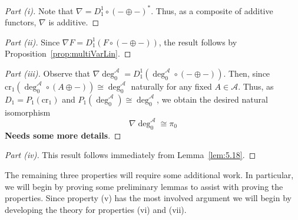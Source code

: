 \begin{proof}[Part (i)]
    Note that $\nabla = D_1^1\circ (-\oplus-)^*$. Thus, as a composite of additive functors, $\nabla$ is additive.
\end{proof}


\begin{proof}[Part (ii)]
    Since $\nabla F = D_1^1(F\circ (-\oplus -))$, the result follows by Proposition~\ref{prop:multiVarLin}. 
\end{proof}


\begin{proof}[Part (iii)]
    Observe that $\nabla\deg_0^\mathcal{A} = D_1^1(\deg_0^\mathcal{A}\circ (-\oplus -))$. Then, since $\text{cr}_1(\deg_0^\mathcal{A}\circ (A\oplus -)) \cong \deg_0^\mathcal{A}$ naturally for any fixed $A \in \mathcal{A}$. Thus, as $D_1 = P_1(\text{cr}_1)$ and $P_1(\deg_0^\mathcal{A}) \cong \deg_0^\mathcal{A}$, we obtain the desired natural isomorphism 
    \begin{equation*}
        \nabla\deg_0^\mathcal{A} \cong \pi_0
    \end{equation*}
    \textbf{Needs some more details}.
\end{proof}


\begin{proof}[Part (iv)]
    This result follows immediately from Lemma~\ref{lem:5.18}.
\end{proof}

The remaining three properties will require some additional work. In particular, we will begin by proving some preliminary lemmas to assist with proving the properties. Since property (v) has the most involved argument we will begin by developing the theory for properties (vi) and (vii). 

